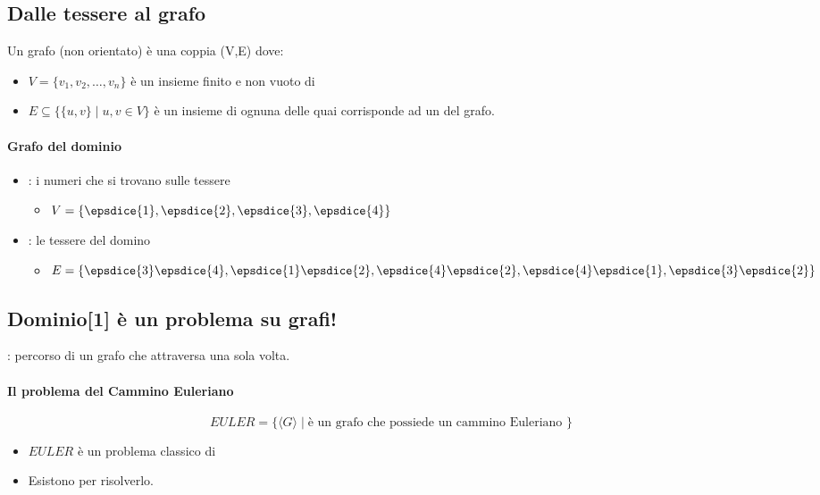 \subsection{Dalle tessere al grafo}
\begin{definition}
  Un grafo (non orientato) è una coppia (V,E) dove:
 \begin{itemize}
   \item $V = \{v_1, v_2,\dots,v_n\}$ è un insieme finito e non vuoto di 
   \item $E\subseteq\big\{\{u,v\}\mid u,v\in V\big\}$ è un insieme di 
     ognuna delle quai corrisponde ad un  del grafo.
 \end{itemize} 
\end{definition}
\paragraph{Grafo del dominio}
\begin{itemize}
  \item {}: i numeri che si trovano sulle tessere
    \begin{itemize}
      \item $V = \{\epsdice{1},\epsdice{2},\epsdice{3},\epsdice{4}\}$
    \end{itemize}
  \item {}: le tessere del domino
    \begin{itemize}
      \item $E =  \{\epsdice{3}\epsdice{4}, \epsdice{1}\epsdice{2},
        \epsdice{4} \epsdice{2},\epsdice{4} \epsdice{1}, 
                   \epsdice{3} \epsdice{2} \}$
    \end{itemize}
\end{itemize}
\subsection{Dominio[1] è un problema su grafi!}
: percorso di un grafo che attraversa 
una sola volta.
\paragraph{Il problema del Cammino Euleriano}
\[
  EULER = \{\langle G\rangle\mid \textrm{
    è un grafo che possiede un cammino Euleriano
  }\}
\]
\begin{itemize}
  \item $EULER$ è un problema classico di 
  \item Esistono  per risolverlo.
\end{itemize}
